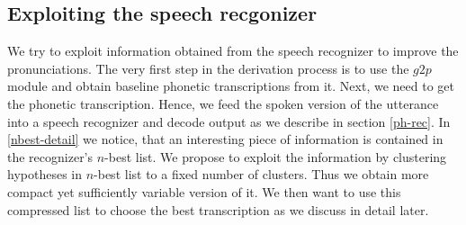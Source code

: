 \subsection{Exploiting the speech recgonizer}
We try to exploit information obtained from the speech recognizer to improve the pronunciations.
The very first step in the derivation process is to use the $g2p$ module and obtain baseline phonetic transcriptions from it.
Next, we need to get the phonetic transcription.
Hence, we feed the spoken version of the utterance into a speech recognizer and decode output as we describe in section \ref{ph-rec}.
In \ref{nbest-detail} we notice, that an interesting piece of information is contained in the  recognizer's $n$-best list.
We propose to exploit the information by clustering hypotheses in $n$-best list to a fixed number of clusters.
Thus we obtain more compact yet sufficiently variable version of it.
We then want to use this compressed list to choose the best transcription as we discuss in detail later.
